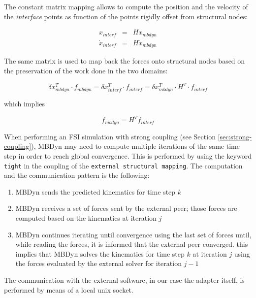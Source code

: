 The constant matrix mapping allows to compute the position and the velocity of the \textit{interface} points as function of the points rigidly offset from structural nodes:

\begin{subequations}
	\begin{eqnarray}
		x_{interf} &=& H x_{mbdyn} \\
		\dot{x}_{interf} &=& H \dot{x}_{mbdyn} 
	\end{eqnarray}
\end{subequations}

The same matrix is used to map back the forces onto structural nodes based on the preservation of the work done in the two domains:

\begin{equation}
	\delta x_{mbdyn}^T \cdot f_{mbdyn} =  \delta x_{interf}^T \cdot f_{interf} = \delta x_{mbdyn}^T \cdot H^T \cdot f_{interf} 
\end{equation}

which implies

\begin{equation}
	f_{mbdyn} = H^T f_{interf}
\end{equation}

When performing an FSI simulation with strong coupling (see Section \ref{sec:strong-coupling}), MBDyn may need to compute multiple iterations of the same time step in order to reach global convergence. This is performed by using the keyword \texttt{tight} in the coupling of the \texttt{external structural mapping}. The computation and the communication pattern is the following:

\begin{enumerate}
	\item MBDyn sends the predicted kinematics for time step $k$
	\item MBDyn receives a set of forces sent by the external peer; those forces are computed based on the kinematics at iteration $j$
	\item MBDyn continues iterating until convergence using the last set of forces until, while reading the forces, it is informed that the external peer converged. this implies that MBDyn solves the kinematics for time step $k$ at iteration $j$ using the forces evaluated by the external solver for iteration $j-1$ 
\end{enumerate}

The communication with the external software, in our case the adapter itself, is performed by means of a local unix socket.


